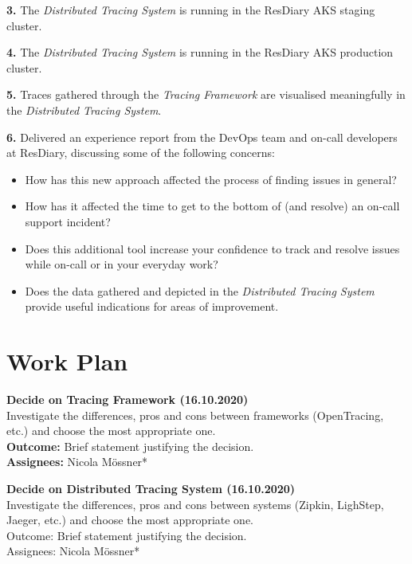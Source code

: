 \documentclass[11pt]{article}
\begin{document}
\textbf{3.} The \textit{Distributed Tracing System} is running in the ResDiary AKS staging cluster.

\textbf{4.} The \textit{Distributed Tracing System} is running in the ResDiary AKS production cluster.

\textbf{5.} Traces gathered through the \textit{Tracing Framework} are visualised meaningfully in the \textit{Distributed Tracing System}.

\textbf{6.} Delivered an experience report from the DevOps team and on-call developers at ResDiary, discussing some of the following concerns:
\begin{itemize}
    \item How has this new approach affected the process of finding issues in general?
    \item How has it affected the time to get to the bottom of (and resolve) an on-call support incident?
    \item Does this additional tool increase your confidence to track and resolve issues while on-call or in your everyday work?
    \item Does the data gathered and depicted in the \textit{Distributed Tracing System} provide useful indications for areas of improvement.
\end{itemize}

\section{Work Plan}
\label{WorkPlan}


\textbf{Decide on Tracing Framework (16.10.2020)}\\
Investigate the differences, pros and cons between frameworks (OpenTracing, etc.) and choose the most appropriate one.\\
\textbf{Outcome:} Brief statement justifying the decision.\\
\textbf{Assignees:} Nicola M\"{o}ssner*

\textbf{Decide on Distributed Tracing System (16.10.2020)}\\
Investigate the differences, pros and cons between systems (Zipkin, LighStep, Jaeger, etc.) and choose the most appropriate one.\\
Outcome: Brief statement justifying the decision.\\
Assignees: Nicola M\"{o}ssner*
\end{document}
